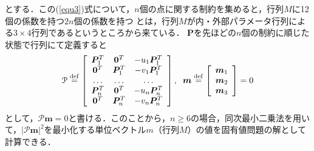 \documentclass[a4paper,10pt]{jarticle}
\begin{document}
%
とする．この(\ref{equ3})式について，$ n $個の点に関する制約を集めると，行列$ M $に12個の係数を持つ$ 2n $個の係数を持つ
とは，行列$ M $が内・外部パラメータ行列による$ 3 \times 4 $行列であるというところから来ている．
$ {\bm P} $を先ほどの$ n $個の制約に順じた状態で行列にて定義すると
%
\begin{equation}
 \mathcal{P} \overset{\mathrm{def}}{=} 
 \left[
  \begin{array}{ccc}
   {\bm P}^T_1 & {\bm 0}^T   & -u_1 {\bm P}^T_1 \\
   {\bm 0}^T   & {\bm P}^T_1 & -v_1 {\bm P}^T_1 \\
   \ldots      & \ldots      & \ldots           \\
   {\bm P}^T_n & {\bm 0}^T   & -u_n {\bm P}^T_n \\
   {\bm 0}^T   & {\bm P}^T_n & -v_n {\bm P}^T_n \\
  \end{array}
 \right] , \hspace{2mm} {\bm m} \overset{\mathrm{def}}{=}
 \left[
  \begin{array}{c}
   {\bm m}_1 \\
   {\bm m}_2 \\
   {\bm m}_3 \\
  \end{array}
 \right] = 0
\label{equ4}
\end{equation}
%
として，$ \mathcal{P} {\bm m} = 0 $と書ける．このことから，$ n \geq 6 $の場合，同次最小二乗法を用いて，$ |\mathcal{P} {\bm m}|^2 $を最小化する単位ベクトル$ m $（行列$ M $）の値を固有値問題の解として計算できる．
\end{document}
